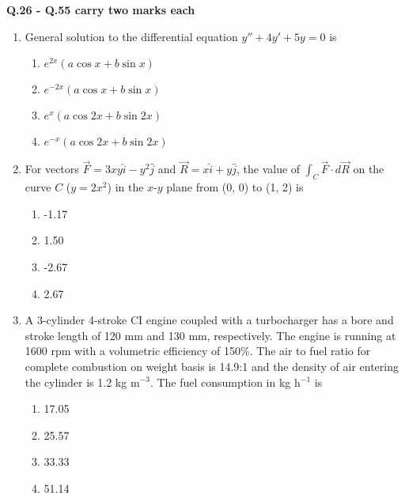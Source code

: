 \documentclass[12pt]{article}
\begin{document}
	\noindent\textbf{Q.26 - Q.55 carry two marks each}
	\begin{enumerate}[label =Q.\arabic*,start=26]
		\item General solution to the differential equation $y'' + 4y' + 5y = 0$ is
			\begin{multicols}{2}
				\begin{enumerate}[label=(\Alph*)]
					\item $e^{2x}(a \cos x + b \sin x)$
					\item $e^{-2x}(a \cos x + b \sin x)$
					\item $e^{x}(a \cos 2x + b \sin 2x)$
					\item $e^{-x}(a \cos 2x + b \sin 2x)$
				\end{enumerate}
			\end{multicols}

		\item For vectors $\vec{F} = 3xy\hat{i} - y^2 \hat{j}$ and $\vec{R} = x\hat{i} + y\hat{j}$, the value of $\int_C \vec{F} \cdot d\vec{R}$ on the curve $C$ ($y = 2x^2$) in the $x$-$y$ plane from (0, 0) to (1, 2) is
			\begin{multicols}{4}
				\begin{enumerate}[label=(\Alph*)]
					\item -1.17
					\item 1.50
					\item -2.67
					\item 2.67
				\end{enumerate}
			\end{multicols}

		\item A 3-cylinder 4-stroke CI engine coupled with a turbocharger has a bore and stroke length of 120 mm and 130 mm, respectively. The engine is running at 1600 rpm with a volumetric efficiency of 150\%. The air to fuel ratio for complete combustion on weight basis is 14.9:1 and the density of air entering the cylinder is 1.2 kg m$^{-3}$. The fuel consumption in kg h$^{-1}$ is
			\begin{multicols}{4}
				\begin{enumerate}[label=(\Alph*)]
					\item 17.05
					\item 25.57
					\item 33.33
					\item 51.14
				\end{enumerate}
			\end{multicols}


\end{enumerate}
\end{document}
